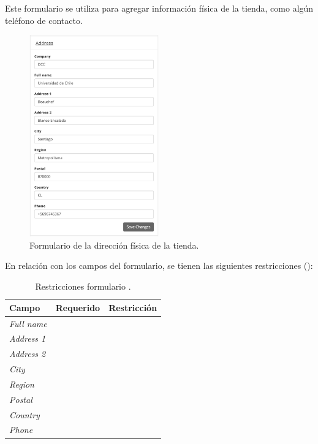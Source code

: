 Este formulario se utiliza para agregar información física de la tienda, como algún teléfono de contacto.

\begin{figure}[H]
	\centering
	\includegraphics[width=0.5\textwidth]{figuras/dashboard/ecommerce/address/menu.png}
	\caption{Formulario de la dirección física de la tienda.}
	\label{figure:dashboard:ecommerce:address:menu}
\end{figure}

En relación con los campos del formulario, se tienen las siguientes restricciones ():

\begin{table}[H]
    \centering
	\begin{tabular}{ |l|c||l| }
		\hline Campo & Requerido & Restricción \\ \hline
		\multirow{1}{*}{\textit{Full name}} &  {\checkmark} &  \\ \hline
		\multirow{1}{*}{\textit{Address 1}} &  {\checkmark} &  \\ \hline
		\multirow{1}{*}{\textit{Address 2}} &   			&  \\ \hline
		\multirow{1}{*}{\textit{City}} 		&  {\checkmark} &  \\ \hline
		\multirow{1}{*}{\textit{Region}} 	&  {\checkmark} &  \\ \hline
		\multirow{1}{*}{\textit{Postal}} 	&  {\checkmark} &  \\ \hline
		\multirow{1}{*}{\textit{Country}}	&  {\checkmark} &  \\ \hline
		\multirow{1}{*}{\textit{Phone}} 	&  {\checkmark} &  \\ \hline
	\end{tabular}
 	\caption{Restricciones formulario \addressPanel.}
    \label{tab:dashboard:ecommerce:form:address}
\end{table}


